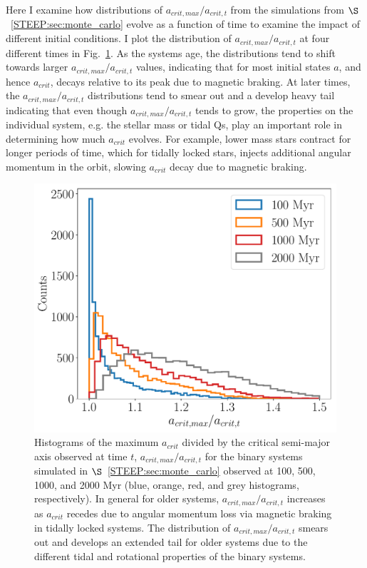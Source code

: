 Here I examine how distributions of $a_{crit,max}/a_{crit,t}$ from the simulations from $\S$~\ref{STEEP:sec:monte_carlo} evolve as a function of time to examine the impact of different initial conditions.  I plot the distribution of $a_{crit,max}/a_{crit,t}$ at four different times in Fig.~\ref{STEEP:fig:acrit_hist}.  As the systems age, the distributions tend to shift towards larger $a_{crit,max}/a_{crit,t}$ values, indicating that for most initial states $a$, and hence $a_{crit}$, decays relative to its peak due to magnetic braking.  At later times, the $a_{crit,max}/a_{crit,t}$ distributions tend to smear out and a develop heavy tail indicating that even though $a_{crit,max}/a_{crit,t}$ tends to grow, the properties on the individual system, e.g. the stellar mass or tidal Qs, play an important role in determining how much $a_{crit}$ evolves.  For example, lower mass stars contract for longer periods of time, which for tidally locked stars, injects additional angular momentum in the orbit, slowing $a_{crit}$ decay due to magnetic braking.

\begin{figure}
	\includegraphics[width=\columnwidth]{acrit_hist.pdf}
    \caption{Histograms of the maximum $a_{crit}$ divided by the critical semi-major axis observed at time $t$, $a_{crit,max}/a_{crit,t}$ for the binary systems simulated in $\S$~\ref{STEEP:sec:monte_carlo} observed at 100, 500, 1000, and 2000 Myr (blue, orange, red, and grey histograms, respectively).  In general for older systems, $a_{crit,max}/a_{crit,t}$ increases as $a_{crit}$ recedes due to angular momentum loss via magnetic braking in tidally locked systems.  The distribution of $a_{crit,max}/a_{crit,t}$ smears out and develops an extended tail for older systems due to the different tidal and rotational properties of the binary systems.}
    \label{STEEP:fig:acrit_hist}
\end{figure}

